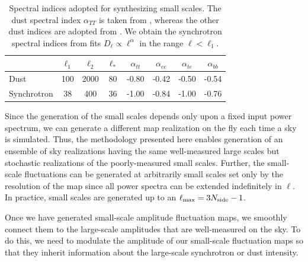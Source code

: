 \documentclass[twocolumn]{aastex631}
\newcommand{\giuse}[1]{\textcolor{orange}{(GP: #1)}}
\begin{document}
\begin{table}
    \centering
    \footnotesize
    \begin{tabular}{lccccccc}
    \toprule 
   &   $ \ell_1  $&$\ell_2$   &$\ell_* $& $\alpha_{tt}$  & $\alpha_{ee}$ &$\alpha_{te}$ &$\alpha_{bb}$ \\
   \midrule  
   Dust & 100 & 2000 & 80 & -0.80 & -0.42& -0.50 & -0.54 \\ 
   Synchrotron & 38 & 400 & 36 & -1.00& -0.84 & -1.00 & -0.76 \\
   \bottomrule
    \end{tabular}
    \caption{Spectral indices adopted for synthesizing  small scales. The dust spectral index $\alpha_{TT}$ is taken from \citet{Miville-Deschenes:2016}, whereas the other dust indices are adopted from \citet{planck2016-l11A}. We obtain the synchrotron spectral indices  from fits $D_{\ell} \propto \ell^{\alpha}$ in the range $\ell<\ell_1$.}
    \label{tab:smallscale_par}
\end{table}

Since the generation of the small scales depends only upon a fixed input power spectrum, we can generate a different map realization on the fly each time a sky is simulated. Thus, the methodology presented here enables generation of an ensemble of sky realizations having the same well-measured large scales but stochastic realizations of the poorly-measured small scales. Further, the small-scale fluctuations can be generated at arbitrarily small scales set only by the resolution of the map since all power spectra can be extended indefinitely in $\ell$. In practice, small scales are generated up to an $\ell_{\rm max} = 3N_{\rm side}-1$.


Once we have generated small-scale amplitude fluctuation maps, we smoothly connect them to the large-scale amplitudes that are well-measured on the sky. To do this, we need to modulate the amplitude of our small-scale fluctuation maps so that they inherit information about the large-scale synchrotron or dust intensity.
\end{document}

